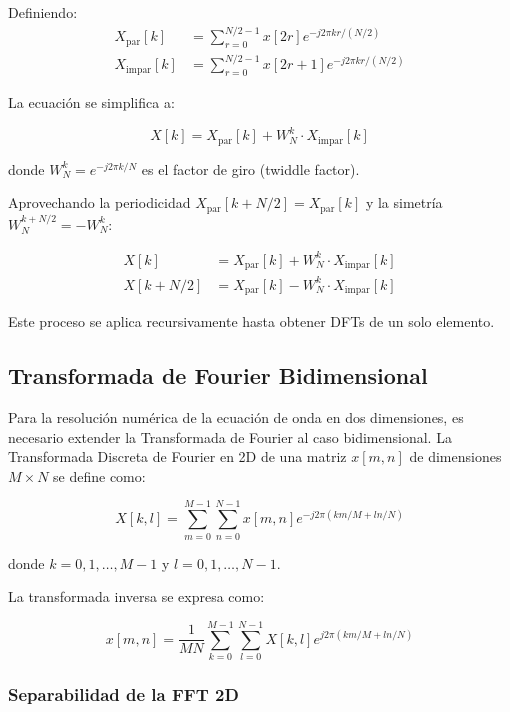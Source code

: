 \documentclass[a4paper]{article}
\begin{document}
Definiendo:
\begin{align}
    X_{\text{par}}[k]   & = \sum_{r=0}^{N/2-1} x[2r] e^{-j2\pi kr/(N/2)}   \\
    X_{\text{impar}}[k] & = \sum_{r=0}^{N/2-1} x[2r+1] e^{-j2\pi kr/(N/2)}
\end{align}

La ecuación se simplifica a:

\begin{equation}
    X[k] = X_{\text{par}}[k] + W_N^k \cdot X_{\text{impar}}[k]
\end{equation}

donde $W_N^k = e^{-j2\pi k/N}$ es el factor de giro (twiddle factor).

Aprovechando la periodicidad $X_{\text{par}}[k + N/2] = X_{\text{par}}[k]$ y la simetría $W_N^{k+N/2} = -W_N^k$:

\begin{align}
    X[k]       & = X_{\text{par}}[k] + W_N^k \cdot X_{\text{impar}}[k] \\
    X[k + N/2] & = X_{\text{par}}[k] - W_N^k \cdot X_{\text{impar}}[k]
\end{align}

Este proceso se aplica recursivamente hasta obtener DFTs de un solo elemento.

\subsection{Transformada de Fourier Bidimensional}

Para la resolución numérica de la ecuación de onda en dos dimensiones, es necesario extender la Transformada de Fourier al caso
bidimensional. La Transformada Discreta de Fourier en 2D de una matriz $x[m,n]$ de dimensiones $M \times N$ se define como:

\begin{equation}
    X[k,l] = \sum_{m=0}^{M-1} \sum_{n=0}^{N-1} x[m,n] e^{-j2\pi (km/M + ln/N)}
\end{equation}

donde $k = 0, 1, \ldots, M-1$ y $l = 0, 1, \ldots, N-1$.

La transformada inversa se expresa como:

\begin{equation}
    x[m,n] = \frac{1}{MN} \sum_{k=0}^{M-1} \sum_{l=0}^{N-1} X[k,l] e^{j2\pi (km/M + ln/N)}
\end{equation}

\subsubsection{Separabilidad de la FFT 2D}
\end{document}
